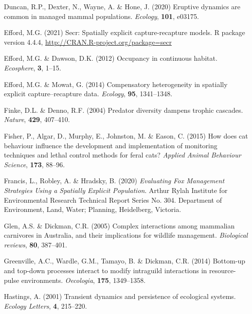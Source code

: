 \documentclass[]{elsarticle} %
\begin{document}
\leavevmode\hypertarget{ref-duncan2020eruptive}{}%
Duncan, R.P., Dexter, N., Wayne, A. \& Hone, J. (2020) Eruptive dynamics are common in managed mammal populations. \emph{Ecology}, \textbf{101}, e03175.

\leavevmode\hypertarget{ref-efford2021secr}{}%
Efford, M.G. (2021) Secr: Spatially explicit capture-recapture models. R package version 4.4.4, \url{http://CRAN.R-project.org/package=secr}

\leavevmode\hypertarget{ref-efford2012occupancy}{}%
Efford, M.G. \& Dawson, D.K. (2012) Occupancy in continuous habitat. \emph{Ecosphere}, \textbf{3}, 1--15.

\leavevmode\hypertarget{ref-efford2014compensatory}{}%
Efford, M.G. \& Mowat, G. (2014) Compensatory heterogeneity in spatially explicit capture--recapture data. \emph{Ecology}, \textbf{95}, 1341--1348.

\leavevmode\hypertarget{ref-finke2004predator}{}%
Finke, D.L. \& Denno, R.F. (2004) Predator diversity dampens trophic cascades. \emph{Nature}, \textbf{429}, 407--410.

\leavevmode\hypertarget{ref-fisher2015cat}{}%
Fisher, P., Algar, D., Murphy, E., Johnston, M. \& Eason, C. (2015) How does cat behaviour influence the development and implementation of monitoring techniques and lethal control methods for feral cats? \emph{Applied Animal Behaviour Science}, \textbf{173}, 88--96.

\leavevmode\hypertarget{ref-francis2020evaluating}{}%
Francis, L., Robley, A. \& Hradsky, B. (2020) \emph{Evaluating Fox Management Strategies Using a Spatially Explicit Population}. Arthur Rylah Institute for Environmental Research Technical Report Series No. 304. Department of Environment, Land, Water; Planning, Heidelberg, Victoria.

\leavevmode\hypertarget{ref-glen2005complex}{}%
Glen, A.S. \& Dickman, C.R. (2005) Complex interactions among mammalian carnivores in Australia, and their implications for wildlife management. \emph{Biological reviews}, \textbf{80}, 387--401.

\leavevmode\hypertarget{ref-greenville2014bottom}{}%
Greenville, A.C., Wardle, G.M., Tamayo, B. \& Dickman, C.R. (2014) Bottom-up and top-down processes interact to modify intraguild interactions in resource-pulse environments. \emph{Oecologia}, \textbf{175}, 1349--1358.

\leavevmode\hypertarget{ref-hastings2001transient}{}%
Hastings, A. (2001) Transient dynamics and persistence of ecological systems. \emph{Ecology Letters}, \textbf{4}, 215--220.
\end{document}
